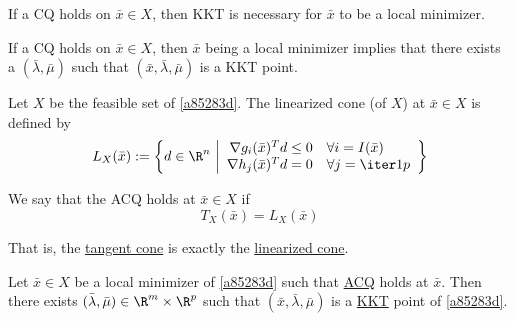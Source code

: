 If a CQ holds on $\bar x\in X$, then KKT is necessary for $\bar x$ to be a
local minimizer.

If a CQ holds on $\bar x\in X$, then $\bar x$ being a local minimizer implies
that there exists a $(\bar\lambda,\bar\mu)$ such that $(\bar
x,\bar\lambda,\bar\mu)$ is a KKT point.

%

\label{ca4f471}

Let $X$ be the feasible set of \ref{a85283d}. The linearized cone (of $X$) at
$\bar x\in X$ is defined by
$$
  L_X(\bar x):=\left\{ d\in\R^n\ \middle\vert
  \begin{array}{r l}
    \nabla g_i(\bar x)^Td\leq0 & \forall i=I(\bar x) \\
    \nabla h_j(\bar x)^Td=0    & \forall j=\iter1p
  \end{array}
  \right\}
$$

\label{adc266e}

We say that the ACQ holds at $\bar x\in X$ if
$$
  T_X(\bar x)=L_X(\bar x)
$$

That is, the \href{add7a4b}{tangent cone} is exactly the
\href{ca4f471}{linearized cone}.

\label{b1c5437}

Let $\bar x\in X$ be a local minimizer of \ref{a85283d} such that
\href{adc266e}{ACQ} holds at $\bar x$. Then there exists
$(\bar\lambda,\bar\mu)\in\R^m\times\R^p$ such that $(\bar
x,\bar\lambda,\bar\mu)$ is a \href{b38093d}{KKT} point of \ref{a85283d}.

